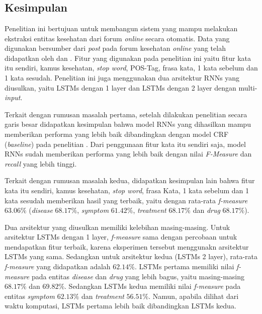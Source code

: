 \chapter{\babEnam}

\section{Kesimpulan}
Penelitian ini bertujuan untuk membangun sistem yang mampu melakukan ekstraksi entitas kesehatan dari forum \textit{online} secara otomatis. Data yang digunakan bersumber dari \textit{post} pada forum kesehatan \textit{online} yang telah didapatkan oleh \cite{skripsiKakRadit} dan \saya. Fitur yang digunakan pada penelitian ini yaitu fitur kata itu sendiri, kamus kesehatan, \textit{stop word}, POS-Tag, frasa kata,  1 kata sebelum dan 1 kata sesudah. Penelitian ini juga menggunakan dua arsitektur RNNs yang diusulkan, yaitu LSTMs dengan 1 layer dan LSTMs dengan 2 layer dengan multi-\textit{input}.

Terkait dengan rumusan masalah pertama, setelah dilakukan penelitian secara garis besar didapatkan kesimpulan bahwa model RNNs yang dihasilkan mampu memberikan performa yang lebih baik dibandingkan dengan model CRF (\textit{baseline}) pada penelitian \cite{skripsiKakRadit}. Dari penggunaan fitur kata itu sendiri saja, model RNNs sudah memberikan performa yang lebih baik dengan nilai \textit{F-Measure} dan \textit{recall} yang lebih tinggi.

Terkait dengan rumusan masalah kedua, didapatkan kesimpulan lain bahwa fitur kata itu sendiri, kamus kesehatan, \textit{stop word}, frasa Kata,  1 kata sebelum dan 1 kata sesudah memberikan hasil yang terbaik, yaitu dengan rata-rata \textit{f-measure} $ 63.06\% $ (\textit{disease} $ 68.17\% $, \textit{symptom} $ 61.42\% $, \textit{treatment} $ 68.17\% $ dan \textit{drug} $ 68.17\% $).

Dua arsitektur yang diusulkan memiliki kelebihan masing-masing. Untuk arsitektur LSTMs dengan 1 layer, \textit{f-measure} sama dengan percobaan untuk mendapatkan fitur terbaik, karena eksperimen tersebut menggunakn arsitektur LSTMs yang sama. Sedangkan untuk arsitektur kedua (LSTMs 2 layer), rata-rata \textit{f-measure} yang didapatkan adalah $ 62.14\% $. LSTMs pertama memiliki nilai \textit{f-measure} pada entitas \textit{disease} dan \textit{drug} yang lebih bagus, yaitu masing-masing $ 68.17\% $ dan $ 69.82\% $. Sedangkan LSTMs kedua memiliki nilai \textit{f-measure} pada entitas \textit{symptom} $ 62.13\% $ dan \textit{treatment} $ 56.51\% $. Namun, apabila dilihat dari waktu komputasi, LSTMs pertama lebih baik dibandingkan LSTMs kedua.

